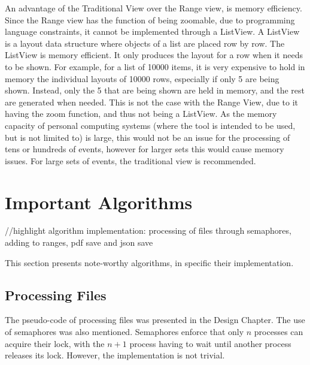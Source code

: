 \par An advantage of the Traditional View over the Range view, is memory efficiency. Since the Range view has the function of being zoomable, due to programming language constraints, it cannot be implemented through a ListView. A ListView is a layout data structure where objects of a list are placed row by row. The ListView is memory efficient. It only produces the layout for a row when it needs to be shown. For example, for a list of 10000 items, it is very expensive to hold in memory the individual layouts of 10000 rows, especially if only 5 are being shown. Instead, only the 5 that are being shown are held in memory, and the rest are generated when needed. This is not the case with the Range View, due to it having the zoom function, and thus not being a ListView. As the memory capacity of personal computing systems (where the tool is intended to be used, but is not limited to) is large, this would not be an issue for the processing of tens or hundreds of events, however for larger sets this would cause memory issues. For large sets of events, the traditional view is recommended.

\section{Important Algorithms}
//highlight algorithm implementation: processing of files through semaphores, adding to ranges, pdf save and json save
\par This section presents note-worthy algorithms, in specific their implementation.
\subsection{Processing Files}
\par The pseudo-code of processing files was presented in the Design Chapter. The use of semaphores was also mentioned. Semaphores enforce that only $n$ processes can acquire their lock, with the $n+1$ process having to wait until another process releases its lock. However, the implementation is not trivial.

